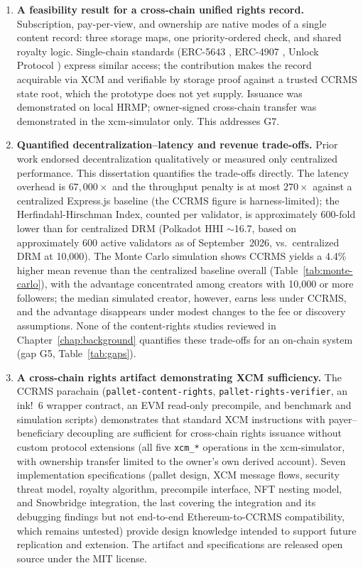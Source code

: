 \begin{enumerate}

\item \textbf{A feasibility result for a cross-chain unified rights record.} Subscription, pay-per-view, and ownership are native modes of a single content record: three storage maps, one priority-ordered check, and shared royalty logic. Single-chain standards (ERC-5643 \citep{cygaar2022}, ERC-4907 \citep{anders2022}, Unlock Protocol \citep{unlockProtocol2026}) express similar access; the contribution makes the record acquirable via XCM and verifiable by storage proof against a trusted CCRMS state root, which the prototype does not yet supply. Issuance was demonstrated on local HRMP; owner-signed cross-chain transfer was demonstrated in the xcm-simulator only. This addresses G7.

\item \textbf{Quantified decentralization--latency and revenue trade-offs.} Prior work endorsed decentralization qualitatively or measured only centralized performance. This dissertation quantifies the trade-offs directly. The latency overhead is $67{,}000\times$ and the throughput penalty is at most $270\times$ against a centralized Express.js baseline (the CCRMS figure is harness-limited); the Herfindahl-Hirschman Index, counted per validator, is approximately 600-fold lower than for centralized DRM (Polkadot HHI $\sim$16.7, based on approximately 600 active validators as of September~2026, vs.\ centralized DRM at 10,000). The Monte Carlo simulation shows CCRMS yields a 4.4\% higher mean revenue than the centralized baseline overall (Table~\ref{tab:monte-carlo}), with the advantage concentrated among creators with 10,000 or more followers; the median simulated creator, however, earns less under CCRMS, and the advantage disappears under modest changes to the fee or discovery assumptions. None of the content-rights studies reviewed in Chapter~\ref{chap:background} quantifies these trade-offs for an on-chain system (gap G5, Table~\ref{tab:gaps}).

\item \textbf{A cross-chain rights artifact demonstrating XCM sufficiency.} The CCRMS parachain (\texttt{pallet-content-rights}, \texttt{pallet-rights-verifier}, an ink!\ 6 wrapper contract, an EVM read-only precompile, and benchmark and simulation scripts) demonstrates that standard XCM instructions with payer--beneficiary decoupling are sufficient for cross-chain rights issuance without custom protocol extensions (all five \texttt{xcm\_*} operations in the xcm-simulator, with ownership transfer limited to the owner's own derived account). Seven implementation specifications (pallet design, XCM message flows, security threat model, royalty algorithm, precompile interface, NFT nesting model, and Snowbridge integration, the last covering the integration and its debugging findings but not end-to-end Ethereum-to-CCRMS compatibility, which remains untested) provide design knowledge intended to support future replication and extension. The artifact and specifications are released open source under the MIT license.

\end{enumerate}

